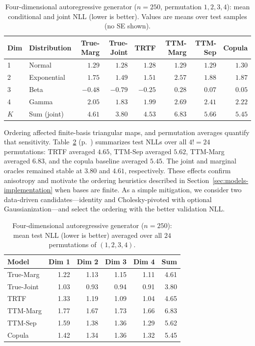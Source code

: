 \documentclass[11pt,a4paper,twoside]{book}\usepackage[]{graphicx}\usepackage[]{xcolor}
\begin{document}
\begin{table}[htbp]
 \centering
 \caption{Four-dimensional autoregressive generator ($n=250$, permutation $1,2,3,4$): mean conditional and joint NLL (lower is better). Values are means over test samples (no SE shown).}
 \label{tab:autoregressive-nll}
 \begin{tabular}{llrrrrrr}
 \hline
 Dim & Distribution & True-Marg & True-Joint & TRTF & TTM-Marg & TTM-Sep & Copula \\
 \hline
 1 & Normal & $1.29$ & $1.28$ & $1.28$ & $1.29$ & $1.29$ & $1.30$ \\
 2 & Exponential & $1.75$ & $1.49$ & $1.51$ & $2.57$ & $1.88$ & $1.87$ \\
 3 & Beta & $-0.48$ & $-0.79$ & $-0.25$ & $0.28$ & $0.07$ & $0.05$ \\
 4 & Gamma & $2.05$ & $1.83$ & $1.99$ & $2.69$ & $2.41$ & $2.22$ \\
 $K$ & Sum (joint) & $4.61$ & $3.80$ & $4.53$ & $6.83$ & $5.66$ & $5.45$ \\
 \hline
 \end{tabular}
\end{table}

Ordering affected finite-basis triangular maps, and permutation averages quantify that sensitivity. Table~\ref{tab:autoregressive-perm} (p.~\pageref{tab:autoregressive-perm}) summarizes test NLLs over all $4! = 24$ permutations: TRTF averaged $4.65$, TTM-Sep averaged $5.62$, TTM-Marg averaged $6.83$, and the copula baseline averaged $5.45$. The joint and marginal oracles remained stable at $3.80$ and $4.61$, respectively. These effects confirm anisotropy and motivate the ordering heuristics described in Section~\ref{sec:models-implementation} when bases are finite. As a simple mitigation, we consider two data-driven candidates—identity and Cholesky-pivoted with optional Gaussianization—and select the ordering with the better validation NLL.

\begin{table}[htbp]
 \centering
 \caption{Four-dimensional autoregressive generator ($n=250$): mean test NLL (lower is better) averaged over all $24$ permutations of $(1,2,3,4)$.}
 \label{tab:autoregressive-perm}
 \begin{tabular}{lrrrrr}
 \hline
 Model & Dim 1 & Dim 2 & Dim 3 & Dim 4 & Sum \\
 \hline
 True-Marg & 1.22 & 1.13 & 1.15 & 1.11 & 4.61 \\
 True-Joint & 1.03 & 0.93 & 0.94 & 0.91 & 3.80 \\
 TRTF & 1.33 & 1.19 & 1.09 & 1.04 & 4.65 \\
 TTM-Marg & 1.77 & 1.67 & 1.73 & 1.66 & 6.83 \\
 TTM-Sep & 1.59 & 1.38 & 1.36 & 1.29 & 5.62 \\
 Copula & 1.42 & 1.34 & 1.36 & 1.32 & 5.45 \\
 \hline
 \end{tabular}
\end{table}
\end{document}

